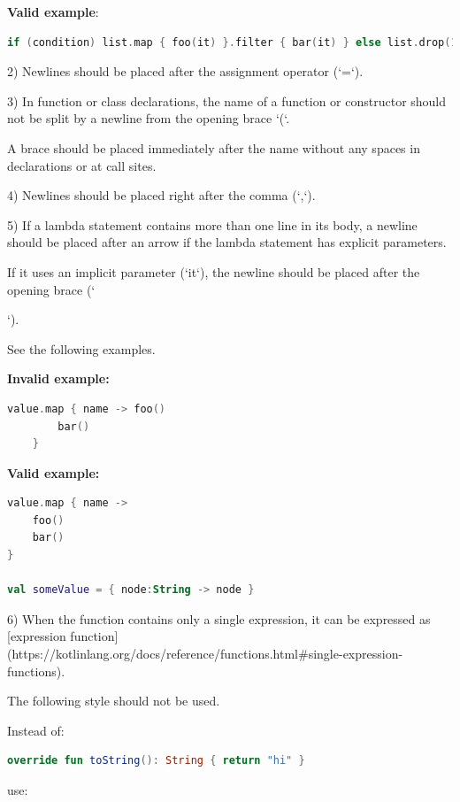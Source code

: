 {\textbf{Valid example}:  

\begin{lstlisting}[language=Kotlin]
if (condition) list.map { foo(it) }.filter { bar(it) } else list.drop(1)
\end{lstlisting}
  

2)	Newlines should be placed after the assignment operator (`=`).

3)	In function or class declarations, the name of a function or constructor should not be split by a newline from the opening brace `(`.

    A brace should be placed immediately after the name without any spaces in declarations or at call sites.

4)	Newlines should be placed right after the comma (`,`).

5)	If a lambda statement contains more than one line in its body, a newline should be placed after an arrow if the lambda statement has explicit parameters.

    If it uses an implicit parameter (`it`), the newline should be placed after the opening brace (`{`).

    See the following examples.





\textbf{Invalid example:}

\begin{lstlisting}[language=Kotlin]
    value.map { name -> foo()
        bar()
    }
\end{lstlisting}


\textbf{Valid example:} 

\begin{lstlisting}[language=Kotlin]
value.map { name ->
    foo()
    bar()
}

val someValue = { node:String -> node }
\end{lstlisting}


6) When the function contains only a single expression, it can be expressed as [expression function](https://kotlinlang.org/docs/reference/functions.html\#single-expression-functions). 

   The following style should not be used.

   

Instead of: 

\begin{lstlisting}[language=Kotlin]
override fun toString(): String { return "hi" }
\end{lstlisting}
use:

}}
